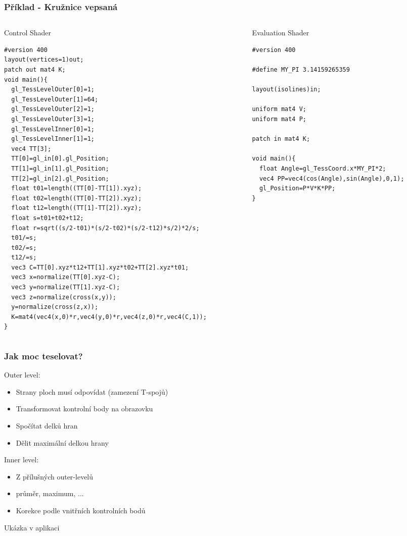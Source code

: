 \begin{frame}[fragile]
    \frametitle{Příklad - Kružnice vepsaná}
  \begin{columns}[T]
    \begin{column}{.44\textwidth}
      Control Shader
  	{\tiny
		\begin{verbatim}
#version 400
layout(vertices=1)out;
patch out mat4 K;
void main(){
  gl_TessLevelOuter[0]=1;
  gl_TessLevelOuter[1]=64;
  gl_TessLevelOuter[2]=1;
  gl_TessLevelOuter[3]=1;
  gl_TessLevelInner[0]=1;
  gl_TessLevelInner[1]=1;
  vec4 TT[3];
  TT[0]=gl_in[0].gl_Position;
  TT[1]=gl_in[1].gl_Position;
  TT[2]=gl_in[2].gl_Position;
  float t01=length((TT[0]-TT[1]).xyz);
  float t02=length((TT[0]-TT[2]).xyz);
  float t12=length((TT[1]-TT[2]).xyz);
  float s=t01+t02+t12;
  float r=sqrt((s/2-t01)*(s/2-t02)*(s/2-t12)*s/2)*2/s;
  t01/=s;
  t02/=s;
  t12/=s;
  vec3 C=TT[0].xyz*t12+TT[1].xyz*t02+TT[2].xyz*t01;
  vec3 x=normalize(TT[0].xyz-C);
  vec3 y=normalize(TT[1].xyz-C);
  vec3 z=normalize(cross(x,y));
  y=normalize(cross(z,x));
  K=mat4(vec4(x,0)*r,vec4(y,0)*r,vec4(z,0)*r,vec4(C,1));
}
  	\end{verbatim}
		}
    \end{column}
    \begin{column}{.48\textwidth}
      Evaluation Shader
  	{\tiny
		\begin{verbatim}
#version 400

#define MY_PI 3.14159265359

layout(isolines)in;

uniform mat4 V;
uniform mat4 P;

patch in mat4 K;

void main(){
  float Angle=gl_TessCoord.x*MY_PI*2;
  vec4 PP=vec4(cos(Angle),sin(Angle),0,1);
  gl_Position=P*V*K*PP;
}
  	\end{verbatim}
		}
    \end{column}
  \end{columns}

\end{frame}


\begin{frame}
\frametitle{Jak moc teselovat?}
	Outer level:
	\begin{itemize}
	\item Strany ploch musí odpovídat (zamezení T-spojů)
	\item Transformovat kontrolní body na obrazovku
	\item Spočítat delků hran
	\item Dělit maximální delkou hrany
	\end{itemize}
	Inner level:
	\begin{itemize}
	\item Z přílušných outer-levelů
	\item průměr, maximum, ...
	\item Korekce podle vnitřních kontrolních bodů
	\end{itemize}
	Ukázka v aplikaci
\end{frame}

